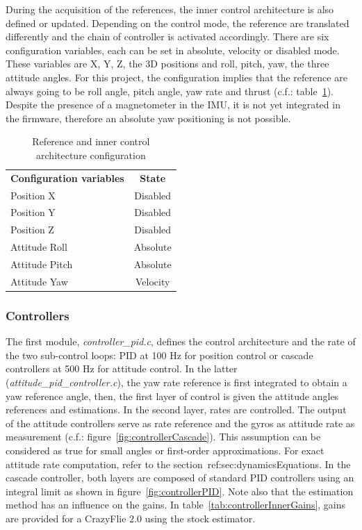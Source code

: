 \documentclass[a4paper, 12pt]{report}
\begin{document}
During the acquisition of the references, the inner control architecture is also defined or updated. Depending on the control mode, the reference are translated differently and the chain of controller is activated accordingly. There are six configuration variables, each can be set in absolute, velocity or disabled mode.  These variables are X, Y, Z, the 3D positions and roll, pitch, yaw, the three attitude angles. For this project, the configuration implies that the reference are always going to be roll angle, pitch angle, yaw rate and thrust (c.f.: table~\ref{tab:setpointConfig}). Despite the presence of a magnetometer in the IMU, it is not yet integrated in the firmware, therefore an absolute yaw positioning is not possible.
\begin{table}[h]
\centering
\caption{Reference and inner control architecture configuration}
\begin{tabular}{|l|c|}
\hline
\textbf{Configuration variables} & \textbf{State}  \\
\hhline{|=|=|}
Position X & Disabled \\
\hline
Position Y & Disabled \\
\hline
Position Z & Disabled \\
\hline
Attitude Roll & Absolute\\
\hline
Attitude Pitch & Absolute\\
\hline
Attitude Yaw & Velocity\\
\hline
\end{tabular}
\label{tab:setpointConfig}
\end{table}

\subsubsection{Controllers}
The first module, \emph{controller\_pid.c}, defines the control architecture and the rate of the two sub-control loops: PID at 100 Hz for position control or cascade controllers at 500 Hz for attitude control. In the latter (\emph{attitude\_pid\_controller.c}), the yaw rate reference is first integrated to obtain a yaw reference angle, then, the first layer of control is given the attitude angles references and estimations. In the second layer, rates are controlled. The output of the attitude controllers serve as rate reference and the gyros as attitude rate as measurement (c.f.: figure~\ref{fig:controllerCascade}). This assumption can be considered as true for small angles or first-order approximations. For exact attitude rate computation, refer to the section~ref:{sec:dynamicsEquations}.  In the cascade controller, both layers  are composed of standard PID controllers using an integral limit as shown in figure~\ref{fig:controllerPID}. Note also that the estimation method has an influence on the gains. In table~\ref{tab:controllerInnerGains}, gains are provided for a CrazyFlie 2.0 using the stock estimator.
\end{document}
